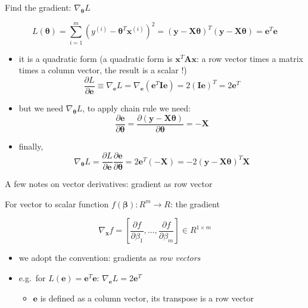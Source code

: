 \documentclass[ignorenonframetext,]{beamer}
\providecommand{\tightlist}{%
  \setlength{\itemsep}{0pt}\setlength{\parskip}{0pt}}
\newcommand{\vv}[1]{\boldsymbol{#1}}
\begin{document}
\begin{frame}{Find the gradient: \(\nabla_{\vv{\theta}}L\)}
\protect\hypertarget{find-the-gradient-nabla_vvthetal}{}

\[L(\vv{\theta}) = \sum_{i=1}^m (y^{(i)} - \vv{\theta}^T\vv{x}^{(i)})^2 = (\vv{y} -\vv{X\theta})^T(\vv{y}-\vv{X\theta}) = \vv{e}^T\vv{e}\]

\begin{itemize}
\tightlist
\item
  it is a quadratic form (a quadratic form is
  \(\vv{x}^T \vv{A} \vv{x}\): a row vector times a matrix times a column
  vector, the result is a scalar !)
  \[\frac{\partial L}{\partial \vv{e}} \equiv \nabla_{\vv{e}} L = \nabla_{\vv{e}} (\vv{e}^T\vv{I}\vv{e}) = 2(\vv{Ie})^T = 2\vv{e}^{T}\]
\item
  but we need \(\nabla_{\vv{\theta}}L\), to apply chain rule we need:
  \[\frac{\partial \vv{e}}{\partial \vv{\theta}} = \frac{\partial (\vv{y}- \vv{X\theta})}{\partial \vv{\theta}} =-\vv{X}\]
\item
  finally,
  \[\nabla_{\vv{\theta}} L = \frac{\partial L}{\partial \vv{e}}\frac{\partial \vv{e}}{\partial \vv{\theta}} = 2\vv{e}^{T}(-\vv{X}) = -2(\vv{y}-\vv{X\theta})^{T}\vv{X} \]
\end{itemize}

\end{frame}

\begin{frame}{A few notes on vector derivatives: gradient as row vector}
\protect\hypertarget{a-few-notes-on-vector-derivatives-gradient-as-row-vector}{}

For vector to scalar function \(f(\vv{\beta}): R^m \rightarrow R\): the
gradient

\[\nabla_{\vv{x}}f = \left [\frac{\partial f}{\partial \beta_1}, \ldots, \frac{\partial f}{\partial \beta_m}\right ]\in R^{1\times m}\]

\begin{itemize}
\tightlist
\item
  we adopt the convention: gradients as \emph{row vectors}
\item
  e.g.~for \(L(\vv{e}) = \vv{e}^T\vv{e}\):
  \(\nabla_{\vv{e}} L = 2\vv{e}^{T}\)

  \begin{itemize}
  \tightlist
  \item
    \(\vv{e}\) is defined as a column vector, its transpose is a row
    vector
  \end{itemize}
\end{itemize}

\end{frame}
\end{document}
